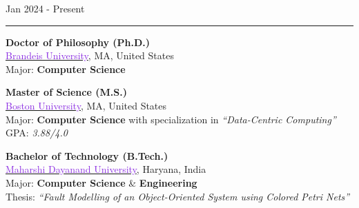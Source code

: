 \begin{minipage}[c]{0.20\textwidth}
	\hfill
	Jan 2024 \-- Present
\end{minipage}%
\hspace{0.01\textwidth}
\begin{minipage}[c]{0.02\textwidth}
	\textcolor{lightgray}{\rule{1pt}{1.2cm}}
\end{minipage}%
\begin{minipage}[c]{0.76\textwidth}
	\raggedright{
		\textbf{Doctor of Philosophy (Ph.D.)}\\
		\href{https://www.brandeis.edu/}{\textcolor{blueviolet}{Brandeis University}}, MA, United States\\
		Major: \textbf{Computer Science}\\
	}
\end{minipage}%

\mediumspace{}

{
	\textbf{Master of Science (M.S.)}\\
	\href{https://www.bu.edu/}{\textcolor{blueviolet}{Boston University}}, MA, United States\\
	Major: \textbf{Computer Science} with specialization in \textit{“Data-Centric Computing''}\\
	GPA: \textit{3.88/4.0}
}

\mediumspace{}

{
	\textbf{Bachelor of Technology (B.Tech.)}\\
	\href{https://mdu.ac.in/}{\textcolor{blueviolet}{Maharshi Dayanand University}}, Haryana, India\\
	Major: \textbf{Computer Science} \& \textbf{Engineering}\\
	Thesis: \textit{“Fault Modelling of an Object-Oriented System using Colored Petri Nets''}\\
}
